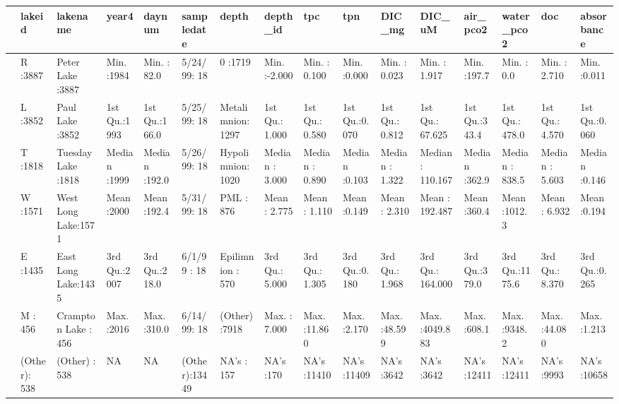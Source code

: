 \documentclass[12pt,]{article}
\begin{document}
\begin{table}[H]
\centering
\begin{tabular}{l|l|l|l|l|l|l|l|l|l|l|l|l|l|l|l}
\hline
  &     lakeid &           lakename &     year4 &     daynum &   sampledate &         depth &    depth\_id &      tpc &      tpn &     DIC\_mg &     DIC\_uM &    air\_pco2 &   water\_pco2 &      doc &   absorbance\\
\hline
 & R      :3887 & Peter Lake    :3887 & Min.   :1984 & Min.   : 82.0 & 5/24/99:   18 & 0          :1719 & Min.   :-2.000 & Min.   : 0.100 & Min.   :0.000 & Min.   : 0.023 & Min.   :   1.917 & Min.   :197.7 & Min.   :   0.0 & Min.   : 2.710 & Min.   :0.011\\
\hline
 & L      :3852 & Paul Lake     :3852 & 1st Qu.:1993 & 1st Qu.:166.0 & 5/25/99:   18 & Metalimnion:1297 & 1st Qu.: 1.000 & 1st Qu.: 0.580 & 1st Qu.:0.070 & 1st Qu.: 0.812 & 1st Qu.:  67.625 & 1st Qu.:343.4 & 1st Qu.: 478.0 & 1st Qu.: 4.570 & 1st Qu.:0.060\\
\hline
 & T      :1818 & Tuesday Lake  :1818 & Median :1999 & Median :192.0 & 5/26/99:   18 & Hypolimnion:1020 & Median : 3.000 & Median : 0.890 & Median :0.103 & Median : 1.322 & Median : 110.167 & Median :362.9 & Median : 838.5 & Median : 5.603 & Median :0.146\\
\hline
 & W      :1571 & West Long Lake:1571 & Mean   :2000 & Mean   :192.4 & 5/31/99:   18 & PML        : 876 & Mean   : 2.775 & Mean   : 1.110 & Mean   :0.149 & Mean   : 2.310 & Mean   : 192.487 & Mean   :360.4 & Mean   :1012.3 & Mean   : 6.932 & Mean   :0.194\\
\hline
 & E      :1435 & East Long Lake:1435 & 3rd Qu.:2007 & 3rd Qu.:218.0 & 6/1/99 :   18 & Epilimnion : 570 & 3rd Qu.: 5.000 & 3rd Qu.: 1.305 & 3rd Qu.:0.180 & 3rd Qu.: 1.968 & 3rd Qu.: 164.000 & 3rd Qu.:379.0 & 3rd Qu.:1175.6 & 3rd Qu.: 8.370 & 3rd Qu.:0.265\\
\hline
 & M      : 456 & Crampton Lake : 456 & Max.   :2016 & Max.   :310.0 & 6/14/99:   18 & (Other)    :7918 & Max.   : 7.000 & Max.   :11.860 & Max.   :2.170 & Max.   :48.599 & Max.   :4049.883 & Max.   :608.1 & Max.   :9348.2 & Max.   :44.080 & Max.   :1.213\\
\hline
 & (Other): 538 & (Other)       : 538 & NA & NA & (Other):13449 & NA's       : 157 & NA's   :170 & NA's   :11410 & NA's   :11409 & NA's   :3642 & NA's   :3642 & NA's   :12411 & NA's   :12411 & NA's   :9993 & NA's   :10658\\
\hline
\end{tabular}
\end{table}
\end{document}
